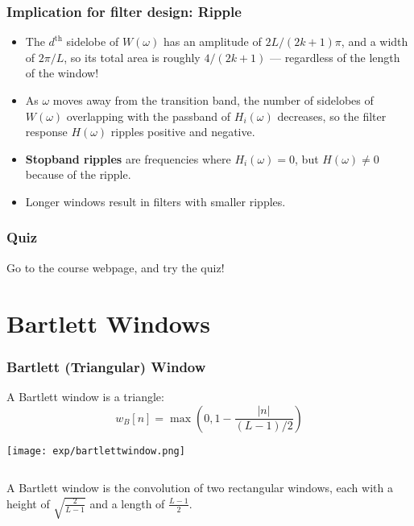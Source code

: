 \documentclass{beamer}
\begin{document}
\begin{frame}
  \frametitle{Implication for filter design: Ripple}
  \begin{itemize}
  \item The $d^{\text{th}}$ sidelobe of $W(\omega)$ has an
    amplitude of $2L/(2k+1)\pi$, and a width of $2\pi/L$, so its
    total area is roughly $4/(2k+1)$ --- regardless of the
    length of the window!  
  \item As $\omega$ moves away from the transition band, the number
    of sidelobes of $W(\omega)$ overlapping with the passband of
    $H_i(\omega)$ decreases, so the filter response $H(\omega)$
    ripples positive and negative.
  \item {\bf Stopband ripples} are frequencies where
    $H_i(\omega)=0$, but $H(\omega)\ne 0$ because of the ripple.
  \item Longer windows result in filters with smaller ripples.
  \end{itemize}
\end{frame}

\begin{frame}
  \frametitle{Quiz}

  Go to the course webpage, and try the quiz!
\end{frame}

\section[Batlett]{Bartlett Windows}
\setcounter{subsection}{1}

\begin{frame}
  \frametitle{Bartlett (Triangular) Window}

  A Bartlett window is a triangle:
  \begin{displaymath}
    w_B[n] = \max\left(0,1-\frac{|n|}{(L-1)/2}\right)
  \end{displaymath}
  \begin{center}
    \texttt{[image: exp/bartlettwindow.png]}
  \end{center}
\end{frame}

\begin{frame}
  \begin{columns}
    \begin{column}{0.5\textwidth}
 
      A Bartlett window is the convolution of two rectangular windows,
      each with a height of $\sqrt{\frac{2}{L-1}}$ and a length of
      $\frac{L-1}{2}$.
    \end{column}
    \begin{column}{0.5\textwidth}
      \centerline{}
    \end{column}
  \end{columns}
\end{frame}
\end{document}
